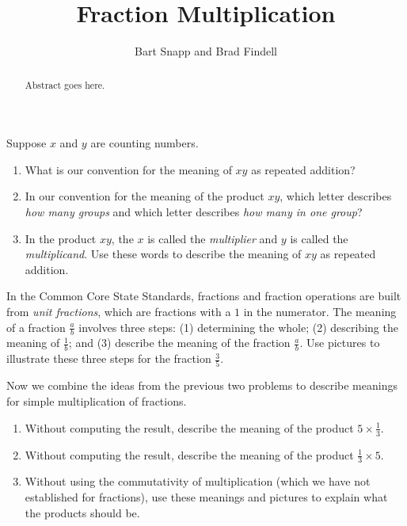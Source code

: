 \documentclass{ximera}
\title{Fraction Multiplication}
\author{Bart Snapp and Brad Findell}
\begin{document}
\begin{abstract}
Abstract goes here.  
\end{abstract}
\maketitle

\label{A:fractionMultiplication}

\begin{problem}
Suppose $x$ and $y$ are counting numbers.  
\begin{enumerate}
\item What is our convention for the meaning of $xy$ as repeated addition?  
\item In our convention for the meaning of the product $xy$, which letter describes 
\emph{how many groups} and which letter describes \emph{how many in one group}? 
\item In the product $xy$, the $x$ is called the \emph{multiplier} and $y$ is called the \emph{multiplicand}.  
Use these words to describe the meaning of $xy$ as repeated addition. 
\end{enumerate}
\end{problem}

\vspace{1in}

\begin{problem}
In the Common Core State Standards, fractions and fraction operations are built from \emph{unit fractions}, which are fractions with a $1$ in the numerator.  The meaning of a fraction $\frac{a}{b}$ involves three steps: (1) determining the whole; (2) describing the meaning of $\frac{1}{b}$; and (3) describe the meaning of the fraction $\frac{a}{b}$.  Use pictures to illustrate these three steps for the fraction
$\frac{3}{5}$.  
\end{problem}

\vspace{1in}

\begin{problem}
Now we combine the ideas from the previous two problems to describe meanings for simple multiplication of fractions.  
\begin{enumerate}
\item Without computing the result, describe the meaning of the product $5 \times \frac{1}{3}$.
\item Without computing the result, describe the meaning of the product $\frac{1}{3}\times 5$.
\item Without using the commutativity of multiplication (which we have not established for fractions), 
use these meanings and pictures to explain what the products should be. 
\end{enumerate}
\end{problem}
\end{document}
